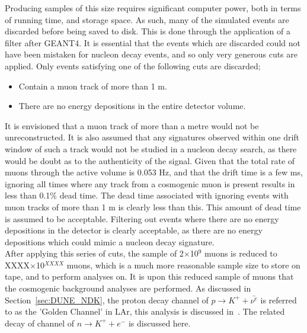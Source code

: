 Producing samples of this size requires significant computer power, both in terms of running time, and storage space. As such, many of the simulated events are discarded before being saved to disk. This is done through the application of a filter after GEANT4. It is essential that the events which are discarded could not have been mistaken for nucleon decay events, and so only very generous cuts are applied. Only events satisfying one of the following cuts are discarded;
\begin{itemize}
\item Contain a muon track of more than 1 m.
\item There are no energy depositions in the entire detector volume.
\end{itemize}
It is envisioned that a muon track of more than a metre would not be unreconstructed. It is also assumed that any signatures observed within one drift window of such a track would not be studied in a nucleon decay search, as there would be doubt as to the authenticity of the signal. Given that the total rate of muons through the active volume is 0.053 Hz, and that the drift time is a few ms, ignoring all times where any track from a cosmogenic muon is present results in less than 0.1\% dead time. The dead time associated with ignoring events with muon tracks of more than 1 m is clearly less than this. This amount of dead time is assumed to be acceptable. Filtering out events where there are no energy depositions in the detector is clearly acceptable, as there are no energy depositions which could mimic a nucleon decay signature. \\

After applying this series of cuts, the sample of 2$\times$10$^9$ muons is reduced to XXXX$\times$10$^{XXXX}$ muons, which is a much more reasonable sample size to store on tape, and to perform analyses on. It is upon this reduced sample of muons that the cosmogenic background analyses are performed. As discussed in Section~\ref{sec:DUNE_NDK}, the proton decay channel of $p \rightarrow K^{+} + \bar{\nu^{e}}$ is referred to as the 'Golden Channel' in LAr, this analysis is discussed in~\citep{NDKTFNote}. The related decay of channel of $n \rightarrow K^{+} + e^{-}$ is discussed here. \\

